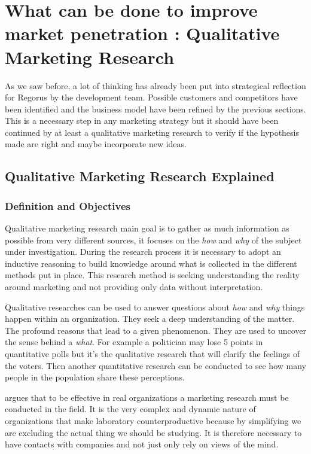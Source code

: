 \documentclass[10pt]{report}
\begin{document}
\section{What can be done to improve market penetration : Qualitative Marketing Research}

As we saw before, a lot of thinking has already been put into strategical reflection for Regorus by the development team. Possible customers and competitors have been identified and the business model have been refined by the previous sections. This is a necessary step in any marketing strategy but it should have been continued by at least a qualitative marketing research to verify if the hypothesis made are right and maybe incorporate new ideas. 

\subsection{Qualitative Marketing Research Explained}

\subsubsection{Definition and Objectives}
Qualitative marketing research main goal is to gather as much information as possible from very different sources, it focuses on the \emph{how} and \emph{why} of the subject under investigation. During the research process it is necessary to adopt an inductive reasoning to build knowledge around what is collected in the different methods put in place. This research method is seeking understanding the reality around marketing and not providing only data without interpretation. \autocite{carson2001}

Qualitative researches can be used to answer questions about \emph{how} and \emph{why} things happen within an organization. They seek a deep understanding of the matter. The profound reasons that lead to a given phenomenon. They are used to uncover the sense behind a \emph{what}. For example a politician may lose 5 points in quantitative polls but it's the qualitative research that will clarify the feelings of the voters. Then another quantitative research can be conducted to see how many people in the population share these perceptions.

\autocite{mintzberg1979} argues that to be effective in real organizations a marketing research must be conducted in the field. It is the very complex and dynamic nature of organizations that make laboratory counterproductive because by simplifying we are excluding the actual thing we should be studying. It is therefore necessary to have contacts with companies and not just only rely on views of the mind.
\end{document}
